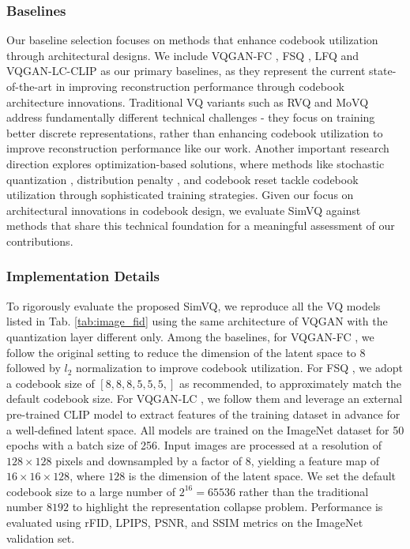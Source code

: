 \subsubsection{Baselines}
Our baseline selection focuses on methods that enhance codebook utilization through architectural designs. We include VQGAN-FC \cite{yu2022vectorquantized}, FSQ \cite{mentzer2024finite}, LFQ \cite{yu2024language} and VQGAN-LC-CLIP \cite{Zhu2024ScalingTC} as our primary baselines, as they represent the current state-of-the-art in improving reconstruction performance through codebook architecture innovations. Traditional VQ variants such as RVQ \cite{Lee2022AutoregressiveIG} and MoVQ \cite{Zheng2022HighQualityPI} address fundamentally different technical challenges - they focus on training better discrete representations, rather than enhancing codebook utilization to improve reconstruction performance like our work. Another important research direction explores optimization-based solutions, where methods like stochastic quantization \cite{pmlr-v162-takida22a}, distribution penalty \cite{VQWasserstein,Xiao2023SCVAESC}, and codebook reset \cite{zheng2023online} tackle codebook utilization through sophisticated training strategies. Given our focus on architectural innovations in codebook design, we evaluate SimVQ against methods that share this technical foundation for a meaningful assessment of our contributions.

\subsubsection{Implementation Details}
To rigorously evaluate the proposed SimVQ, we reproduce all the VQ models listed in Tab. \ref{tab:image_fid} using the same architecture of VQGAN \cite{Esser_2021_CVPR} with the quantization layer different only.
Among the baselines, for VQGAN-FC \cite{yu2022vectorquantized}, we follow the original setting to reduce the dimension of the latent space to $8$ followed by $l_2$ normalization to improve codebook utilization. For FSQ \cite{mentzer2024finite}, we adopt a codebook size of $[8,8,8,5,5,5,]$ as recommended, to approximately match the default codebook size. For VQGAN-LC \cite{Zhu2024ScalingTC}, we follow them and leverage an external pre-trained CLIP model to extract features of the training dataset in advance for a well-defined latent space. All models are trained on the ImageNet \cite{5206848} dataset for 50 epochs with a batch size of 256. Input images are processed at a resolution of $128\times 128$ pixels and downsampled by a factor of $8$, yielding a feature map of $16\times 16 \times 128$, where $128$ is the dimension of the latent space. We set the default codebook size to a large number of $2^{16}=65536$ rather than the traditional number $8192$ to highlight the representation collapse problem. Performance is evaluated using rFID, LPIPS, PSNR, and SSIM metrics on the ImageNet validation set.




